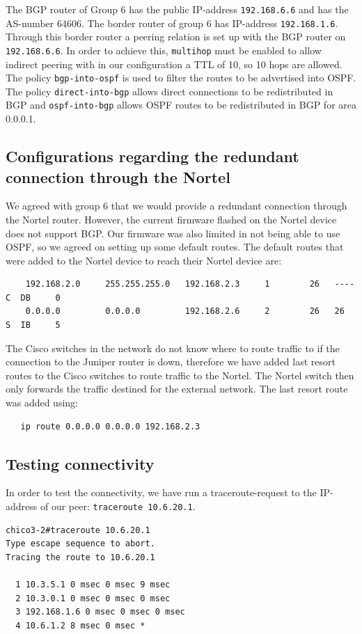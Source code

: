 \documentclass[10pt,a4paper]{article}
\begin{document}
The BGP router of Group 6 has the public IP-address \texttt{192.168.6.6} and has the AS-number 64606. The border router of group 6 has IP-address \texttt{192.168.1.6}. Through this border router a peering relation is set up with the BGP router on \texttt{192.168.6.6}. In order to achieve this, \texttt{multihop} must be enabled to allow indirect peering with in our configuration a TTL of 10, so 10 hops are allowed. The policy \texttt{bgp-into-ospf} is used to filter the routes to be advertised into OSPF. The policy \texttt{direct-into-bgp} allows direct connections to be redistributed in BGP and \texttt{ospf-into-bgp} allows OSPF routes to be redistributed in BGP for area 0.0.0.1.

\subsection{Configurations regarding the redundant connection through the Nortel}
We agreed with group 6 that we would provide a redundant connection through the Nortel router. However, the current firmware flashed on the Nortel device does not support BGP. Our firmware was also limited in not being able to use OSPF, so we agreed on setting up some default routes. The default routes that were added to the Nortel device to reach their Nortel device are:
\begin{verbatim}
    192.168.2.0     255.255.255.0   192.168.2.3     1        26   ----  C  DB     0
    0.0.0.0         0.0.0.0         192.168.2.6     2        26   26    S  IB     5
\end{verbatim}

The Cisco switches in the network do not know where to route traffic to if the connection to the Juniper router is down, therefore we have added last resort routes to the Cisco switches to route traffic to the Nortel. The Nortel switch then only forwards the traffic destined for the external network. The last resort route was added using:
\begin{verbatim}
   ip route 0.0.0.0 0.0.0.0 192.168.2.3
\end{verbatim}

\subsection{Testing connectivity}
In order to test the connectivity, we have run a traceroute-request to the IP-address of our peer: \texttt{traceroute 10.6.20.1}.

\begin{verbatim}
chico3-2#traceroute 10.6.20.1
Type escape sequence to abort.
Tracing the route to 10.6.20.1

  1 10.3.5.1 0 msec 0 msec 9 msec
  2 10.3.0.1 0 msec 0 msec 0 msec
  3 192.168.1.6 0 msec 0 msec 0 msec
  4 10.6.1.2 8 msec 0 msec * 

\end{verbatim}
\end{document}
